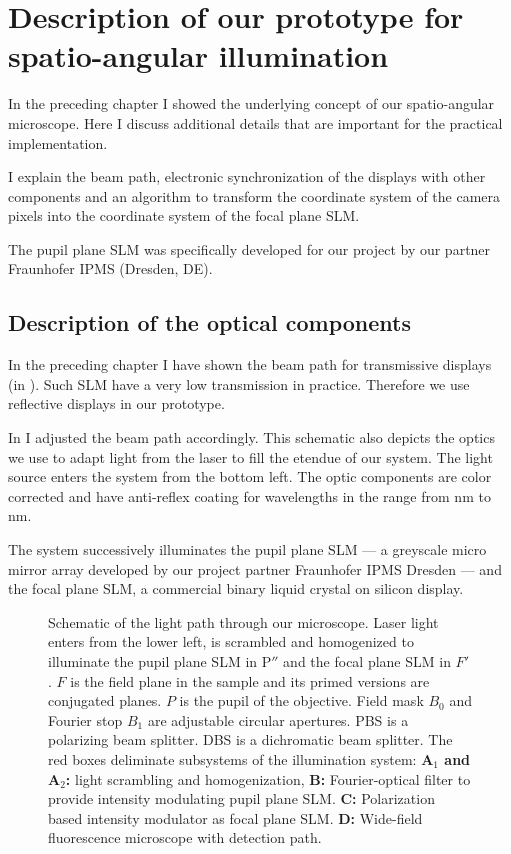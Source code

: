 
\chapter{Description of our prototype for spatio-angular illumination}
\label{sec:dev1}
\begin{summary}
  In the preceding chapter I showed the underlying concept of our
  spatio-angular microscope. Here I discuss additional details that
  are important for the practical implementation.

  I explain the beam path, electronic synchronization of the displays
  with other components and an algorithm to transform the coordinate
  system of the camera pixels into the coordinate system of the focal
  plane SLM.
  
  The pupil plane SLM was specifically developed for our project by    
  our partner Fraunhofer IPMS (Dresden, DE). 
\end{summary}
\section{Description of the optical components}
In the preceding chapter I have shown the beam path for
transmissive displays (in ). Such SLM have a
very low transmission in practice. Therefore we use reflective
displays in our prototype.

In  I adjusted the beam path accordingly. This
schematic also depicts the optics we use to adapt light from the laser
to fill the etendue of our system. The light source enters the system
from the bottom left. The optic components are color corrected and
have anti-reflex coating for wavelengths in the range from
\unit[400]{nm} to \unit[700]{nm}.

The system successively illuminates the pupil plane SLM --- a greyscale
micro mirror array developed by our project partner Fraunhofer IPMS
Dresden --- and the focal plane SLM, a commercial binary liquid crystal
on silicon display. 

\begin{figure}[!htbp]
  \centering
  \caption{Schematic of the light path through our microscope. Laser
    light enters from the lower left, is scrambled and homogenized to
    illuminate the pupil plane SLM in $\textrm{P}''$ and the focal
    plane SLM in $F'$. $F$ is the field plane in the sample and its
    primed versions are conjugated planes. $P$ is the pupil of the
    objective. Field mask $B_0$ and Fourier stop $B_1$ are adjustable
    circular apertures. PBS is a polarizing beam splitter. DBS is a
    dichromatic beam splitter.  The red boxes deliminate subsystems of
    the illumination system: {\color{Orchid}\bf A$_1$ and A$_2$:}
    light scrambling and homogenization, {\color{Orchid}\bf B:}
    Fourier-optical filter to provide intensity modulating pupil plane
    SLM. {\color{Orchid}\bf C:} Polarization based intensity modulator
    as focal plane SLM. {\color{Orchid}\bf D:} Wide-field fluorescence
    microscope with detection path.}
  \label{fig:memi-real}
\end{figure}

